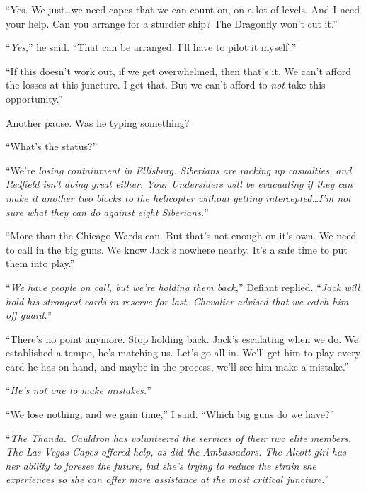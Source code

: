 ``Yes.  We just\ldots we need capes that we can count on, on a lot of levels.  And I need your help.  Can you arrange for a sturdier ship?  The Dragonfly won't cut it.''



``\emph{Yes},'' he said.  ``That can be arranged.  I'll have to pilot it myself\emph{.}''



``If this doesn't work out, if we get overwhelmed, then that's it.  We can't afford the losses at this juncture. I get that.  But we can't afford to \emph{not} take this opportunity.''



Another pause.  Was he typing something?



``What's the status?''



``We're \emph{losing containment in Ellisburg.  Siberians are racking up casualties, and Redfield isn't doing great either.  Your Undersiders will be evacuating if they can make it another two blocks to the helicopter without getting intercepted\ldots I'm not sure what they can do against eight Siberians.}''



``More than the Chicago Wards can.  But that's not enough on it's own.  We need to call in the big guns.  We know Jack's nowhere nearby.  It's a safe time to put them into play.''



``\emph{We have people on call, but we're holding them back,}'' Defiant replied.  ``\emph{Jack will hold his strongest cards in reserve for last.  Chevalier advised that we catch him off guard.}''



``There's no point anymore.  Stop holding back.  Jack's escalating when we do.  We established a tempo, he's matching us.  Let's go all-in.  We'll get him to play every card he has on hand, and maybe in the process, we'll see him make a mistake.''



``\emph{He's not one to make mistakes.}''



``We lose nothing, and we gain time,'' I said.  ``Which big guns do we have?''



``\emph{The Thanda.  Cauldron has volunteered the services of their two elite members.  The Las Vegas Capes offered help, as did the Ambassadors.  The Alcott girl has her ability to foresee the future, but she's trying to reduce the strain she experiences so she can offer more assistance at the most critical juncture.}''



